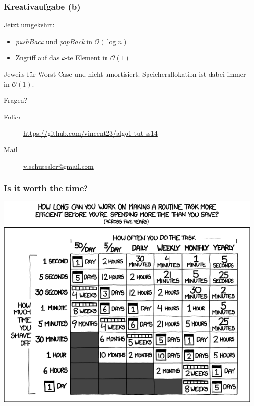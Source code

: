 \begin{frame}
	\frametitle{Kreativaufgabe (b)}
	Jetzt umgekehrt:

	\begin{itemize}
		\item \emph{pushBack} und \emph{popBack} in $\mathcal{O}(\log{n})$
		\item Zugriff auf das $k$-te Element in $\mathcal{O}(1)$
	\end{itemize}

	Jeweils für Worst-Case und nicht amortisiert.
	Speicherallokation ist dabei immer in $\mathcal{O}(1)$.
\end{frame}

\begin{frame}
	\Huge
	\begin{center}
		Fragen?
	\end{center}
	\small
	\begin{description}
		\item[Folien] \url{https://github.com/vincent23/algo1-tut-ss14}
		\item[Mail] \href{mailto:v.schuessler@gmail.com}{v.schuessler@gmail.com}
	\end{description}
\end{frame}

\begin{frame}
	\frametitle{Is it worth the time?}
	\begin{center}
		\includegraphics[width=\textwidth,height=\textheight,keepaspectratio]{images/is_it_worth_the_time}
	\end{center}
\end{frame}


